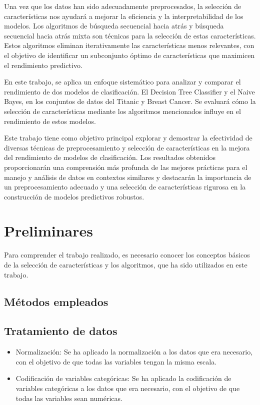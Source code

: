 \documentclass[conference,a4paper]{IEEEtran}
\begin{document}
Una vez que los datos han sido adecuadamente preprocesados, la selección de características nos ayudará a mejorar 
la eficiencia y la interpretabilidad de los modelos. Los algoritmos de búsqueda secuencial hacia atrás y búsqueda secuencial hacia atrás 
mixta son técnicas para la selección de estas características. Estos algoritmos eliminan iterativamente las características menos
relevantes, con el objetivo de identificar un subconjunto óptimo de características que maximicen el rendimiento predictivo.

En este trabajo, se aplica un enfoque sistemático para analizar y comparar el rendimiento de dos modelos de clasificación.  
El Decision Tree Classifier y el Naive Bayes, en los conjuntos de datos del Titanic y Breast Cancer. Se evaluará cómo la 
selección de características mediante los algoritmos mencionados influye en el rendimiento de estos modelos.

Este trabajo tiene como objetivo principal explorar y demostrar la efectividad de diversas técnicas de preprocesamiento y selección de
características en la mejora del rendimiento de modelos de clasificación. Los resultados obtenidos proporcionarán una comprensión más
profunda de las mejores prácticas para el manejo y análisis de datos en contextos similares y destacarán la importancia de un preprocesamiento
adecuado y una selección de características rigurosa en la construcción de modelos predictivos robustos.

\section{Preliminares}

Para comprender el trabajo realizado, es necesario conocer los conceptos básicos de la selección de características y los algoritmos,
que ha sido utilizados en este trabajo.

\subsection{Métodos empleados}

   \subsection*{Tratamiento de datos}
    \begin{itemize}
      \item Normalización: Se ha aplicado la normalización a los datos que era necesario, con el objetivo de que todas las variables 
      tengan la misma escala.
      \item Codificación de variables categóricas: Se ha aplicado la codificación de variables categóricas a los datos que era necesario,
       con el objetivo de que todas las variables sean numéricas.
    \end{itemize}
\end{document}
